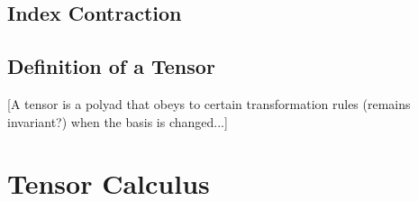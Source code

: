 

\subsection{Index Contraction}

\subsection{Definition of a Tensor}
[A tensor is a polyad that obeys to certain transformation rules (remains invariant?) when the basis is changed...]















\section{Tensor Calculus}





%
%
